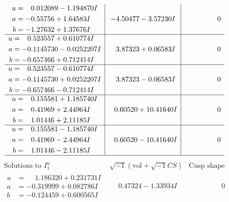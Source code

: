 \documentclass[1p]{elsarticle_modified}
\theoremstyle{definition}
\newcommand{\I}{\sqrt{-1}}
\begin{document}
$$\begin{array}{c|c|c}
\begin{aligned}
u &= \phantom{-}0.012089 - 1.194870 I \\
a &= -0.55756 + 1.64583 I \\
b &= -1.27632 + 1.37676 I\end{aligned}
 & -4.50477 - 3.57230 I & \phantom{-0.000000 } 0 \\ \hline\begin{aligned}
u &= \phantom{-}0.523557 + 0.610774 I \\
a &= -0.1145730 - 0.0252207 I \\
b &= -0.657466 + 0.712414 I\end{aligned}
 & \phantom{-}3.87323 + 0.06583 I & \phantom{-0.000000 } 0 \\ \hline\begin{aligned}
u &= \phantom{-}0.523557 - 0.610774 I \\
a &= -0.1145730 + 0.0252207 I \\
b &= -0.657466 - 0.712414 I\end{aligned}
 & \phantom{-}3.87323 - 0.06583 I & \phantom{-0.000000 } 0 \\ \hline\begin{aligned}
u &= \phantom{-}0.155581 + 1.185740 I \\
a &= \phantom{-}0.41969 + 2.44964 I \\
b &= \phantom{-}1.01446 + 2.11185 I\end{aligned}
 & \phantom{-}0.60520 + 10.41640 I & \phantom{-0.000000 } 0 \\ \hline\begin{aligned}
u &= \phantom{-}0.155581 - 1.185740 I \\
a &= \phantom{-}0.41969 - 2.44964 I \\
b &= \phantom{-}1.01446 - 2.11185 I\end{aligned}
 & \phantom{-}0.60520 - 10.41640 I & \phantom{-0.000000 } 0\\
 \hline 
 \end{array}$$\newpage$$\begin{array}{c|c|c}  
\text{Solutions to }I^u_{1}& \I (\text{vol} + \sqrt{-1}CS) & \text{Cusp shape}\\
 \hline 
\begin{aligned}
u &= \phantom{-}1.186320 + 0.231731 I \\
a &= -0.319999 + 0.082786 I \\
b &= -0.124459 + 0.600565 I\end{aligned}
 & \phantom{-}0.47324 - 1.33934 I & \phantom{-0.000000 } 0 \\ \hline\begin{aligned}

\end{aligned}
\end{array}$$
\end{document}
